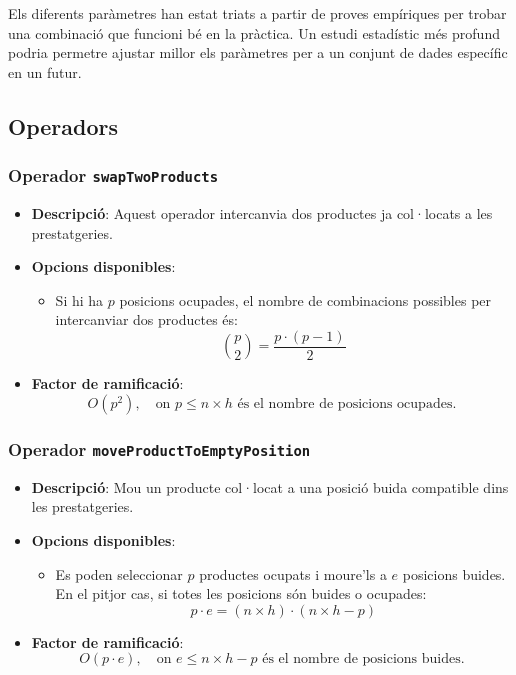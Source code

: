 \documentclass[a4paper,12pt]{report}
\begin{document}
Els diferents paràmetres han estat triats a partir de proves empíriques per trobar una combinació que funcioni bé en la pràctica. Un estudi estadístic més profund podria permetre ajustar millor els paràmetres per a un conjunt de dades específic en un futur.

\subsection {Operadors}

\subsubsection{Operador \texttt{swapTwoProducts}}
\begin{itemize}
    \item \textbf{Descripció}: Aquest operador intercanvia dos productes ja col·locats a les prestatgeries.
    \item \textbf{Opcions disponibles}: 
    \begin{itemize}
        \item Si hi ha \(p\) posicions ocupades, el nombre de combinacions possibles per intercanviar dos productes és:
        \[
        \binom{p}{2} = \frac{p \cdot (p - 1)}{2}
        \]
    \end{itemize}
    \item \textbf{Factor de ramificació}:
    \[
    O(p^2), \quad \text{on } p \leq n \times h \text{ és el nombre de posicions ocupades.}
    \]
\end{itemize}

\subsubsection{Operador \texttt{moveProductToEmptyPosition}}
\begin{itemize}
    \item \textbf{Descripció}: Mou un producte col·locat a una posició buida compatible dins les prestatgeries.
    \item \textbf{Opcions disponibles}: 
    \begin{itemize}
        \item Es poden seleccionar \(p\) productes ocupats i moure'ls a \(e\) posicions buides. En el pitjor cas, si totes les posicions són buides o ocupades:
        \[
        p \cdot e = (n \times h) \cdot (n \times h - p)
        \]
    \end{itemize}
    \item \textbf{Factor de ramificació}:
    \[
    O(p \cdot e), \quad \text{on } e \leq n \times h - p \text{ és el nombre de posicions buides.}
    \]
\end{itemize}
\end{document}
